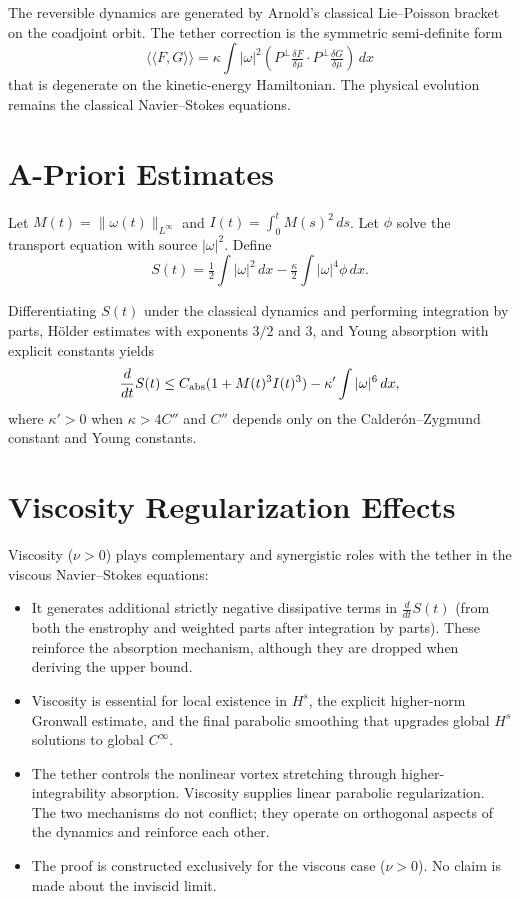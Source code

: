 \documentclass[11pt,a4paper]{article}
\begin{document}
The reversible dynamics are generated by Arnold’s classical Lie--Poisson bracket on the coadjoint orbit. The tether correction is the symmetric semi-definite form
\[
\langle\langle F, G \rangle\rangle = \kappa \int |\omega|^2 (P^\perp \tfrac{\delta F}{\delta \mu} \cdot P^\perp \tfrac{\delta G}{\delta \mu})\, dx
\]
that is degenerate on the kinetic-energy Hamiltonian. The physical evolution remains the classical Navier--Stokes equations.

\section{A-Priori Estimates}

Let \( M(t) = \|\omega(t)\|_{L^\infty} \) and \( I(t) = \int_0^t M(s)^2 \, ds \). Let \( \phi \) solve the transport equation with source \( |\omega|^2 \). Define
\[
S(t) = \tfrac12 \int |\omega|^2 \, dx - \tfrac\kappa2 \int |\omega|^4 \phi \, dx.
\]

Differentiating \( S(t) \) under the classical dynamics and performing integration by parts, Hölder estimates with exponents \( 3/2 \) and \( 3 \), and Young absorption with explicit constants yields
\[
\frac{d}{dt} S(t) \le C_{\rm abs} (1 + M(t)^3 I(t)^3) - \kappa' \int |\omega|^6 \, dx,
\]
where \( \kappa' > 0 \) when \( \kappa > 4 C'' \) and \( C'' \) depends only on the Calderón--Zygmund constant and Young constants.

\section{Viscosity Regularization Effects}

Viscosity (\(\nu > 0\)) plays complementary and synergistic roles with the tether in the viscous Navier--Stokes equations:

\begin{itemize}
    \item It generates additional strictly negative dissipative terms in \(\frac{d}{dt}S(t)\) (from both the enstrophy and weighted parts after integration by parts). These reinforce the absorption mechanism, although they are dropped when deriving the upper bound.
    \item Viscosity is essential for local existence in \(H^s\), the explicit higher-norm Gronwall estimate, and the final parabolic smoothing that upgrades global \(H^s\) solutions to global \(C^\infty\).
    \item The tether controls the nonlinear vortex stretching through higher-integrability absorption. Viscosity supplies linear parabolic regularization. The two mechanisms do not conflict; they operate on orthogonal aspects of the dynamics and reinforce each other.
    \item The proof is constructed exclusively for the viscous case (\(\nu > 0\)). No claim is made about the inviscid limit.
\end{itemize}
\end{document}
